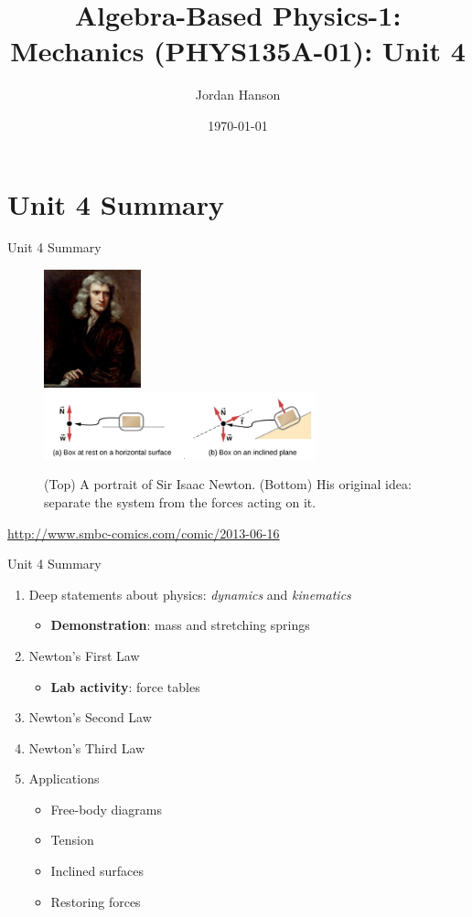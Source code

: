 \documentclass{beamer}
\title{Algebra-Based Physics-1: Mechanics (PHYS135A-01): Unit 4}
\date{\today}
\author{Jordan Hanson}
\institute{Whittier College Department of Physics and Astronomy}
\begin{document}
\maketitle

\section{Unit 4 Summary}

\begin{frame}{Unit 4 Summary}
\begin{figure}
\centering
\includegraphics[width=0.25\textwidth]{figures/newton.png} \\
\includegraphics[width=0.7\textwidth]{figures/forcesA.png}
\caption{\label{fig:newton} (Top) A portrait of Sir Isaac Newton. (Bottom) His original idea: separate the system from the forces acting on it.}
\end{figure}
\url{http://www.smbc-comics.com/comic/2013-06-16}
\end{frame}

\begin{frame}{Unit 4 Summary}
\begin{enumerate}
\item Deep statements about physics: \textit{dynamics} and \textit{kinematics}
\begin{itemize}
\item \textbf{Demonstration}: mass and stretching springs
\end{itemize}
\item Newton's \alert{First Law}
\begin{itemize}
\item \textbf{Lab activity}: force tables
\end{itemize}
\item Newton's \alert{Second Law}
\item Newton's \alert{Third Law}
\item Applications
\begin{itemize}
\item Free-body diagrams
\item Tension
\item Inclined surfaces
\item Restoring forces
\end{itemize}
\end{enumerate}
\end{frame}
\end{document}

